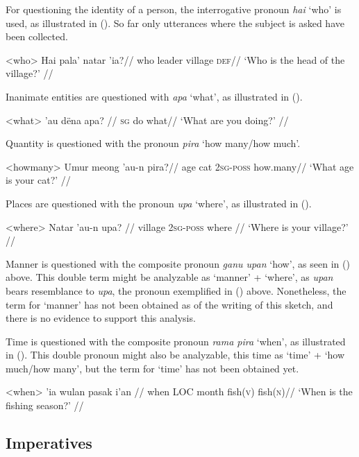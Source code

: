 \documentclass[12pt]{article}
\begin{document}
For questioning the identity of a person, the interrogative pronoun \textit{hai} `who' is used, as illustrated in (). So far only utterances where the subject is asked have been collected.

\ex<who>
\begingl %
\gla Hai pala' natar 'ia?//
\glb who leader village \textsc{def}//
\glft `Who is the head of the village?' //
\endgl
\xe



Inanimate entities are questioned with \textit{apa} `what', as illustrated in ().

\ex<what>
\begingl %
\gla 'au dëna apa? //
\textsc{sg} do what//
\glft `What are you doing?' // 
\endgl
\xe


Quantity is questioned with the pronoun \textit{pira} `how many/how much'.

\ex<howmany>
\begingl %
\gla Umur meong 'au-n pira?//
\glb age cat 2\textsc{sg}-\textsc{poss} how.many//
\glft `What age is your cat?' // 
\endgl 
\xe


Places are questioned with the pronoun \textit{upa} `where', as illustrated in ().

\ex<where>
\begingl %
\gla Natar 'au-n upa? //
\glb village \textsc{2sg}-\textsc{poss} where //
\glft `Where is your village?' // 
\endgl
\xe 

Manner is questioned with the composite pronoun \textit{ganu upan} `how', as seen in () above. This double term might be analyzable as `manner' + `where', as \textit{upan} bears resemblance to \textit{upa}, the pronoun exemplified in () above. Nonetheless, the term for `manner' has not been obtained as of the writing of this sketch, and there is no evidence to support this analysis.

Time is questioned with the composite pronoun \textit{rama pira} `when', as illustrated in (). This double pronoun might also be analyzable, this time as `time' + `how much/how many', but the term for `time' has not been obtained yet.

\ex<when>
\begingl %
 'ia wulan pasak i'an //
\glb when \textsc{LOC} month fish(\textsc{v}) fish(\textsc{n})//
\glft `When is the fishing season?' // 
\endgl
\xe

\subsection{Imperatives}
\end{document}
